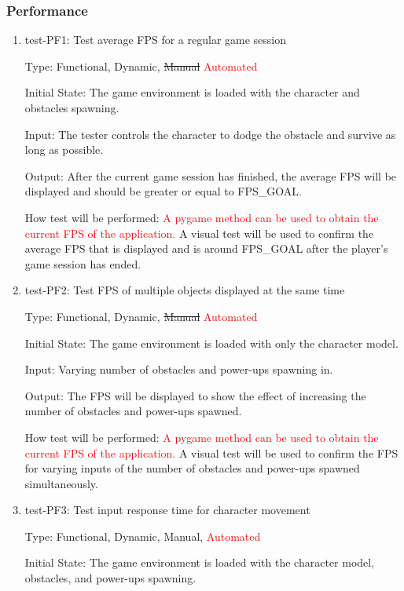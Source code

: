 \documentclass[12pt, titlepage]{article}
\begin{document}
\subsubsection{Performance}
\begin{enumerate}
\item{test-PF1: Test average FPS for a regular game session\\}

Type: Functional, Dynamic, \sout{Manual} \textcolor{red}{Automated}
					
Initial State: The game environment is loaded with the character and obstacles spawning.

Input: The tester controls the character to dodge the obstacle and survive as long as possible.
					
Output: After the current game session has finished, the average FPS will be displayed and should be greater or equal to FPS\_GOAL.
					
How test will be performed: \textcolor{red}{A pygame method can be used to obtain the current FPS of the application.} A visual test will be used to confirm the average FPS that is displayed and is around FPS\_GOAL after the player's game session has ended.

\item{test-PF2: Test FPS of multiple objects displayed at the same time\\}

Type: Functional, Dynamic, \sout{Manual} \textcolor{red}{Automated}
					
Initial State: The game environment is loaded with only the character model.

Input: Varying number of obstacles and power-ups spawning in.
					
Output: The FPS will be displayed to show the effect of increasing the number of obstacles and power-ups spawned.
					
How test will be performed: \textcolor{red}{A pygame method can be used to obtain the current FPS of the application.} A visual test will be used to confirm the FPS for varying inputs of the number of obstacles and power-ups spawned simultaneously. 


\item{test-PF3: Test input response time for character movement\\}

Type: Functional, Dynamic, Manual, \textcolor{red}{Automated}
					
Initial State: The game environment is loaded with the character model, obstacles, and power-ups spawning.


\end{enumerate}
\end{document}
